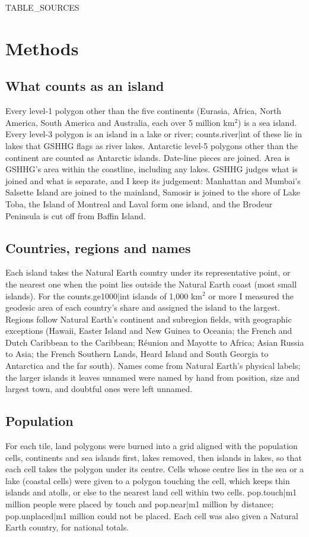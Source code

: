\documentclass[11pt,a4paper]{article}
\begin{document}
{{TABLE_SOURCES}}

\section{Methods}
\subsection{What counts as an island}
Every level-1 polygon other than the five continents (Eurasia, Africa, North America, South America and Australia, each over 5 million km$^2$) is a sea island. Every level-3 polygon is an island in a lake or river; {{counts.river|int}} of these lie in lakes that GSHHG flags as river lakes. Antarctic level-5 polygons other than the continent are counted as Antarctic islands. Date-line pieces are joined. Area is GSHHG's area within the coastline, including any lakes. GSHHG judges what is joined and what is separate, and I keep its judgement: Manhattan and Mumbai's Salsette Island are joined to the mainland, Samosir is joined to the shore of Lake Toba, the Island of Montreal and Laval form one island, and the Brodeur Peninsula is cut off from Baffin Island.

\subsection{Countries, regions and names}
Each island takes the Natural Earth country under its representative point, or the nearest one when the point lies outside the Natural Earth coast (most small islands). For the {{counts.ge1000|int}} islands of 1,000 km$^2$ or more I measured the geodesic area of each country's share and assigned the island to the largest. Regions follow Natural Earth's continent and subregion fields, with geographic exceptions (Hawaii, Easter Island and New Guinea to Oceania; the French and Dutch Caribbean to the Caribbean; R\'eunion and Mayotte to Africa; Asian Russia to Asia; the French Southern Lands, Heard Island and South Georgia to Antarctica and the far south). Names come from Natural Earth's physical labels; the larger islands it leaves unnamed were named by hand from position, size and largest town, and doubtful ones were left unnamed.

\subsection{Population}
For each tile, land polygons were burned into a grid aligned with the population cells, continents and sea islands first, lakes removed, then islands in lakes, so that each cell takes the polygon under its centre. Cells whose centre lies in the sea or a lake (coastal cells) were given to a polygon touching the cell, which keeps thin islands and atolls, or else to the nearest land cell within two cells. {{pop.touch|m1}} million people were placed by touch and {{pop.near|m1}} million by distance; {{pop.unplaced|m1}} million could not be placed. Each cell was also given a Natural Earth country, for national totals.
\end{document}
